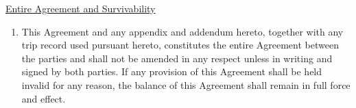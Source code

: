 \underline{Entire Agreement and Survivability}
\begin{enumerate}
    \item This Agreement and any appendix and addendum hereto, together
    with any trip record used pursuant hereto, constitutes the entire
    Agreement between the parties and shall not be amended in any respect
    unless in writing and signed by both parties. If any provision of this
    Agreement shall be held invalid for any reason, the balance of this
    Agreement shall remain in full force and effect.
\end{enumerate}